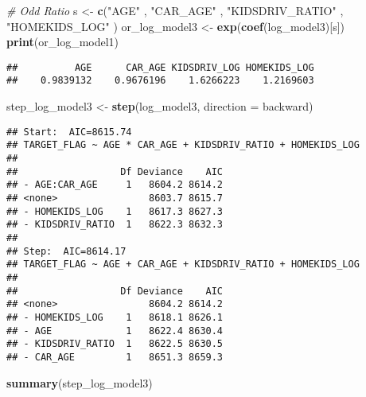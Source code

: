 \documentclass[
]{article}
\newenvironment{Shaded}{\begin{snugshade}}{\end{snugshade}}
\newcommand{\AttributeTok}[1]{\textcolor[rgb]{0.13,0.29,0.53}{#1}}
\newcommand{\CommentTok}[1]{\textcolor[rgb]{0.56,0.35,0.01}{\textit{#1}}}
\newcommand{\FunctionTok}[1]{\textcolor[rgb]{0.13,0.29,0.53}{\textbf{#1}}}
\newcommand{\NormalTok}[1]{#1}
\newcommand{\OtherTok}[1]{\textcolor[rgb]{0.56,0.35,0.01}{#1}}
\newcommand{\StringTok}[1]{\textcolor[rgb]{0.31,0.60,0.02}{#1}}
\begin{document}
\begin{Shaded}
\begin{Highlighting}[]
\CommentTok{\# Odd Ratio }
\NormalTok{s }\OtherTok{\textless{}{-}} \FunctionTok{c}\NormalTok{(}\StringTok{"AGE"}\NormalTok{ , }\StringTok{"CAR\_AGE"}\NormalTok{ , }\StringTok{"KIDSDRIV\_RATIO"}\NormalTok{ , }\StringTok{"HOMEKIDS\_LOG"}\NormalTok{ )}
\NormalTok{or\_log\_model3 }\OtherTok{\textless{}{-}} \FunctionTok{exp}\NormalTok{(}\FunctionTok{coef}\NormalTok{(log\_model3)[s])}
\FunctionTok{print}\NormalTok{(or\_log\_model1)}
\end{Highlighting}
\end{Shaded}

\begin{verbatim}
##          AGE      CAR_AGE KIDSDRIV_LOG HOMEKIDS_LOG 
##    0.9839132    0.9676196    1.6266223    1.2169603
\end{verbatim}

\begin{Shaded}
\begin{Highlighting}[]
\NormalTok{step\_log\_model3 }\OtherTok{\textless{}{-}} \FunctionTok{step}\NormalTok{(log\_model3, }\AttributeTok{direction =} \StringTok{\textquotesingle{}backward\textquotesingle{}}\NormalTok{)}
\end{Highlighting}
\end{Shaded}

\begin{verbatim}
## Start:  AIC=8615.74
## TARGET_FLAG ~ AGE * CAR_AGE + KIDSDRIV_RATIO + HOMEKIDS_LOG
## 
##                  Df Deviance    AIC
## - AGE:CAR_AGE     1   8604.2 8614.2
## <none>                8603.7 8615.7
## - HOMEKIDS_LOG    1   8617.3 8627.3
## - KIDSDRIV_RATIO  1   8622.3 8632.3
## 
## Step:  AIC=8614.17
## TARGET_FLAG ~ AGE + CAR_AGE + KIDSDRIV_RATIO + HOMEKIDS_LOG
## 
##                  Df Deviance    AIC
## <none>                8604.2 8614.2
## - HOMEKIDS_LOG    1   8618.1 8626.1
## - AGE             1   8622.4 8630.4
## - KIDSDRIV_RATIO  1   8622.5 8630.5
## - CAR_AGE         1   8651.3 8659.3
\end{verbatim}

\begin{Shaded}
\begin{Highlighting}[]
\FunctionTok{summary}\NormalTok{(step\_log\_model3)}
\end{Highlighting}
\end{Shaded}
\end{document}
